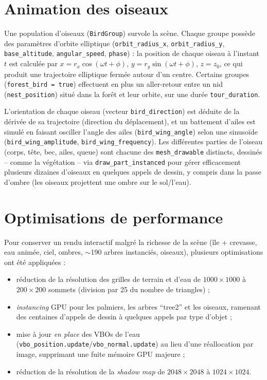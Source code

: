 \documentclass[11pt,a4paper]{article}
\begin{document}
\section{Animation des oiseaux}
\label{sec:animation}

Une population d'oiseaux (\texttt{BirdGroup}) survole la scène. Chaque
groupe possède des paramètres d'orbite elliptique
(\texttt{orbit\_radius\_x}, \texttt{orbit\_radius\_y},
\texttt{base\_altitude}, \texttt{angular\_speed}, \texttt{phase}) : la
position de chaque oiseau à l'instant $t$ est calculée par
$x = r_x \cos(\omega t + \phi)$, $y = r_y \sin(\omega t + \phi)$,
$z = z_0$, ce qui produit une trajectoire elliptique fermée autour d'un
centre. Certains groupes (\texttt{forest\_bird = true}) effectuent en
plus un aller-retour entre un nid (\texttt{nest\_position}) situé dans
la forêt et leur orbite, sur une durée \texttt{tour\_duration}.

L'orientation de chaque oiseau (vecteur \texttt{bird\_direction}) est
déduite de la dérivée de sa trajectoire (direction du déplacement), et
un battement d'ailes est simulé en faisant osciller l'angle des ailes
(\texttt{bird\_wing\_angle}) selon une sinusoïde
(\texttt{bird\_wing\_amplitude}, \texttt{bird\_wing\_frequency}). Les
différentes parties de l'oiseau (corps, tête, bec, ailes, queue) sont
chacune des \texttt{mesh\_drawable} distincts, dessinés -- comme la
végétation -- via \texttt{draw\_part\_instanced} pour gérer
efficacement plusieurs dizaines d'oiseaux en quelques appels de dessin,
y compris dans la passe d'ombre (les oiseaux projettent une ombre sur
le sol/l'eau).

\section{Optimisations de performance}

Pour conserver un rendu interactif malgré la richesse de la scène
(île + crevasse, eau animée, ciel, ombres, $\sim$190 arbres instanciés,
oiseaux), plusieurs optimisations ont été appliquées :

\begin{itemize}
    \item réduction de la résolution des grilles de terrain et d'eau de
    $1000\times1000$ à $200\times200$ sommets (division par 25 du nombre
    de triangles) ;
    \item \emph{instancing} GPU pour les palmiers, les arbres ``tree2''
    et les oiseaux, ramenant des centaines d'appels de dessin à
    quelques appels par type d'objet ;
    \item mise à jour \emph{en place} des VBOs de l'eau
    (\texttt{vbo\_position.update}/\texttt{vbo\_normal.update}) au lieu
    d'une réallocation par image, supprimant une fuite mémoire GPU
    majeure ;
    \item réduction de la résolution de la \emph{shadow map} de
    $2048\times2048$ à $1024\times1024$.
\end{itemize}
\end{document}
